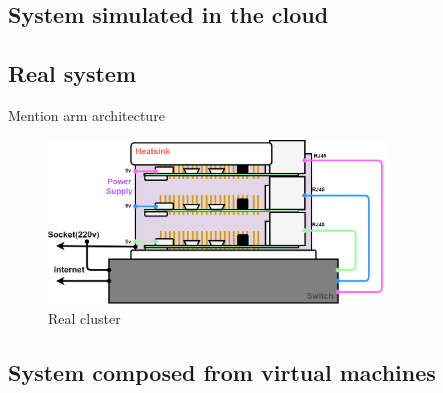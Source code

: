 \subsection{System simulated in the cloud}

\subsection{Real system}
Mention arm architecture
\begin{figure}[H]
    \centering
    \includegraphics[width=0.8\textwidth]{pictures/cluster.png}
    \caption{ Real cluster }
    \label{fig:cluster}
\end{figure}
\subsection{System composed from virtual machines}